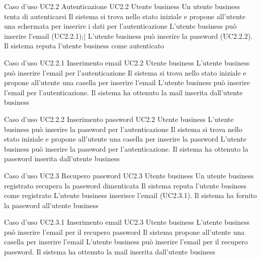 \UCtitle
{Caso d'uso UC2.2}
{Autenticazione}
\UC
{UC2.2}
{Utente business}
{Un utente business tenta di autenticarsi}
{Il sistema si trova nello stato iniziale e propone all'utente una schermata per inserire i dati per l'autenticazione}
\scenario
{
L'utente business può inserire l'email (UC2.2.1);|
L'utente business può inserire la password (UC2.2.2).
}
\post
{Il sistema reputa l'utente business come autenticato}

\UCtitle
{Caso d'uso UC2.2.1}
{Inserimento email}
\UC
{UC2.2}
{Utente business}
{L'utente business può inserire l'email per l'autenticazione}
{Il sistema si trova nello stato iniziale e propone all'utente una casella per inserire l'email}
\scenario
{L'utente business può inserire l'email per l'autenticazione.}
\post
{Il sistema ha ottenuto la mail inserita dall'utente business}

\UCtitle
{Caso d'uso UC2.2.2}
{Inserimento password}
\UC
{UC2.2}
{Utente business}
{L'utente business può inserire la password per l'autenticazione}
{Il sistema si trova nello stato iniziale e propone all'utente una casella per inserire la password}
\scenario
{L'utente business può inserire la password per l'autenticazione.}
\post
{Il sistema ha ottenuto la password inserita dall'utente business}

\UCtitle
{Caso d'uso UC2.3}
{Recupero password}
\UC
{UC2.3}
{Utente business}
{Un utente business registrato recupera la password dimenticata}
{Il sistema  reputa l'utente business come registrato}
\scenario
{L'utente business inserisce l'email (UC2.3.1).
}
\post
{Il sistema ha fornito la password all'utente business}

\UCtitle
{Caso d'uso UC2.3.1}
{Inserimento email}
\UC
{UC2.3}
{Utente business}
{L'utente business può inserire l'email per il recupero password}
{Il sistema propone all'utente una casella per inserire l'email}
\scenario
{L'utente business può inserire l'email per il recupero password.}
\post
{Il sistema ha ottenuto la mail inserita dall'utente business}


